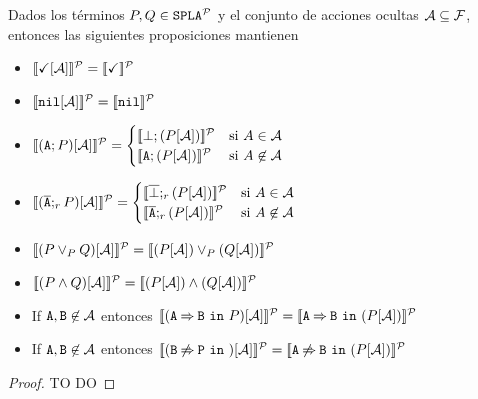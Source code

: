 \begin{proposition}
  Dados los términos $P,Q\in\mathtt{SPLA{^{\cal P}}}$ y el conjunto de acciones ocultas ${\cal A}\subseteq{\cal F}$, entonces
  las siguientes proposiciones mantienen
  \begin{itemize}
  \item $[\![\checkmark[{\cal A}]]\!]^{\cal P}=[\![\checkmark]\!]^{\cal P}$
  \item $[\![\mathtt{nil}[{\cal A}]]\!]^{\cal P}=[\![\mathtt{nil}]\!]^{\cal P}$
  \item
      $\semdenp{(\fA;P)\hide\calA}=
      \begin{cases}
        \semdenp{\bot;(P\hide\calA)} & \mbox{si } A\in\calA\\
        \semdenp{\fA;(P\hide\calA)} & \mbox{si } A\not\in\calA\\
      \end{cases}$
  \item
      $\semdenp{(\ofA;_rP)\hide\calA}=
      \begin{cases}
        \semdenp{\overline{\bot};_r(P\hide\calA)} & \mbox{si } A\in\calA\\
        \semdenp{\ofA;_r(P\hide\calA)} & \mbox{si } A\not\in\calA\\
      \end{cases}$
  \item $[\![(P\mathbin{\lor}_P Q)[{\cal A}]]\!]^{\cal P}=[\![(P[{\cal A}])\mathbin{\lor}_P (Q[{\cal A}])]\!]^{\cal P}$
  \item $[\![(P\mathbin{\wedge} Q)[{\cal A}]]\!]^{\cal P}=[\![(P[{\cal A}])\mathbin{\wedge} (Q[{\cal A}])]\!]^{\cal P}$
  \item If ${\mathtt{A}},{\mathtt{B}}\not\in{\cal A}$ entonces 
    $[\![(\mathtt{A}\mathbin{\Rightarrow}\mathtt{B}\ \mathtt{in}\ P)[{\cal A}]]\!]^{\cal P}=[\![\mathtt{A}\mathbin{\Rightarrow}\mathtt{B}\ \mathtt{in}\ (P[{\cal A}])]\!]^{\cal P}$
  \item If ${\mathtt{A}},{\mathtt{B}}\not\in{\cal A}$ entonces 
    $[\![(\mathtt{B}\mathbin{\not\Rightarrow}\mathtt{P}\ \mathtt{in}\ )[{\cal A}]]\!]^{\cal P}=[\![\mathtt{A}\mathbin{\not\Rightarrow}\mathtt{B}\ \mathtt{in}\ (P[{\cal A}])]\!]^{\cal P}$
  \end{itemize}
  \begin{proof}
    TO DO 
  \end{proof}
\end{proposition}

